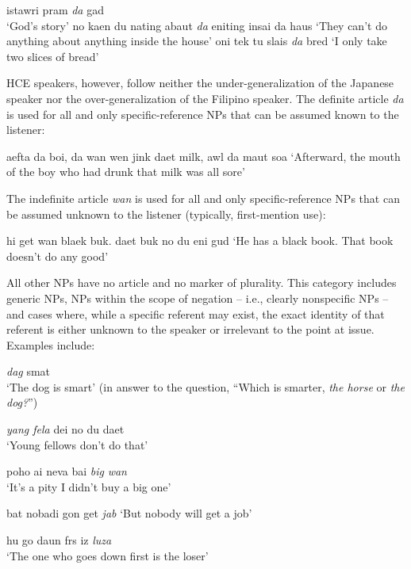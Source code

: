 \ea\label{ex:31}
 istawri pram \textit{da} gad\\
\glt   `God's story'
\z
\ea\label{ex:32}
 no kaen du nating abaut \textit{da} eniting insai da haus
\glt   `They can't do anything about anything inside the house'
\z
\ea\label{ex:33}
 oni tek tu slais \textit{da} bred
\glt `I only take two slices of bread'
\z

HCE speakers, however, follow neither the under-generalization of the Japanese speaker nor the over-generalization of the Filipino speaker. The definite article \textit{da} is used for all and only specific-refer\-ence NPs that can be assumed known to the listener:

\ea\label{ex:34}
 aefta da boi, da wan wen jink daet milk, awl da maut soa 
\glt `Afterward, the mouth of the boy who had drunk that milk was all sore'
\z

\noindent The indefinite article \textit{wan} is used for all and only specific-reference NPs that can be assumed unknown to the listener (typically, first-mention use):

\ea\label{ex:35}
 hi get wan blaek buk. daet buk no du eni gud
\glt `He has a black book. That book doesn't do any good'
\z

\noindent All other NPs have no article and no marker of plurality. This category includes generic NPs, NPs within the scope of negation -- i.e., clearly nonspecific NPs -- and cases where, while a specific referent may exist, the exact identity of that referent is either unknown to the speaker or irrelevant to the point at issue. Examples include:

\ea\label{ex:36}
\textit{dag} smat\\
\glt `The dog is smart' (in answer to the question, ``Which is smarter, \textit{the horse} or \textit{the dog?}'')
\z

\ea\label{ex:37}
\textit{yang fela} dei no du daet \\
\glt `Young fellows don't do that'
\z


\ea\label{ex:38}
poho ai neva bai \textit{big} \textit{wan}\\
\glt `It's a pity I didn't buy a big one'
\z

\ea\label{ex:39}
bat nobadi gon get \textit{jab}
\glt `But nobody will get a job'
\z

\ea\label{ex:40}
hu go daun frs iz \textit{luza}\\
\glt `The one who goes down first is the loser'
\z


